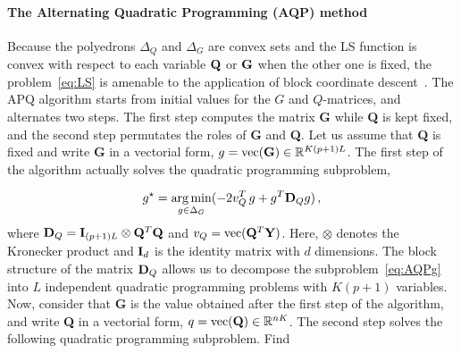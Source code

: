 \paragraph{The Alternating Quadratic Programming (AQP) method} Because the
poly\-edrons $\Delta_Q$ and $\Delta_G$ are convex sets and the LS function is
convex with respect to each variable ${\bf Q}$ or ${\bf G}$ when the other one
is fixed, the problem~\eqref{eq:LS} is amenable to the application of block
coordinate descent~\citep{Bertsekas1995}. The APQ algorithm starts from initial
values for the $G$ and $Q$-matrices, and alternates two steps. The first step
computes the matrix {\bf G} while {\bf Q} is kept fixed, and the second step
permutates the roles of {\bf G} and {\bf Q}. Let us assume that {\bf Q} is fixed
and write {\bf G} in a vectorial form, $g = {\rm vec({\bf G})} \in
\mathbb{R}^{K(p + 1)L}$. The first step of the algorithm actually solves the
quadratic programming subproblem, 

\begin{equation}
\begin{aligned}
g^\star = \underset{g \in \Delta_G}{\arg \min}  ( -2  v^T_Q \, g + g^T {\bf D}_Q g ) \, ,  
\end{aligned}
\label{eq:AQPg}
\end{equation}
\noindent where ${\bf D}_Q = {\bf I}_{(p+1)L} \otimes {\bf Q}^T {\bf Q}$ and
$v_Q = {\rm vec}({\bf Q}^T {\bf Y})$. Here, $\otimes$ denotes the Kronecker
product and ${\bf I}_d$ is the identity matrix with $d$ dimensions. The block
structure of the matrix ${\bf D}_Q$ allows us to decompose the
subproblem~\eqref{eq:AQPg} into $L$ independent quadratic programming problems
with $K(p + 1)$ variables. Now, consider that {\bf G} is the value obtained
after the first step of the algorithm, and write {\bf Q} in a vectorial form, $q
= {\rm vec({\bf Q})} \in \mathbb{R}^{nK}$. The second step solves the following
quadratic programming subproblem. Find

